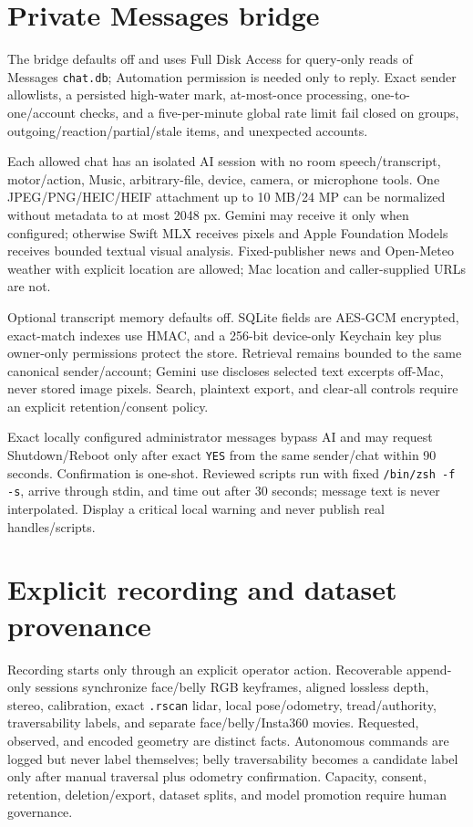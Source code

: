 \documentclass[10pt,openany]{book}
\begin{document}
\section{Private Messages bridge}

\Experimental\quad The bridge defaults off and uses Full Disk Access for query-only reads of Messages \texttt{chat.db}; Automation permission is needed only to reply. Exact sender allowlists, a persisted high-water mark, at-most-once processing, one-to-one/account checks, and a five-per-minute global rate limit fail closed on groups, outgoing/reaction/partial/stale items, and unexpected accounts.

Each allowed chat has an isolated AI session with no room speech/transcript, motor/action, Music, arbitrary-file, device, camera, or microphone tools. One JPEG/PNG/HEIC/HEIF attachment up to 10 MB/24 MP can be normalized without metadata to at most 2048 px. Gemini may receive it only when configured; otherwise Swift MLX receives pixels and Apple Foundation Models receives bounded textual visual analysis. Fixed-publisher news and Open-Meteo weather with explicit location are allowed; Mac location and caller-supplied URLs are not.

Optional transcript memory defaults off. SQLite fields are AES-GCM encrypted, exact-match indexes use HMAC, and a 256-bit device-only Keychain key plus owner-only permissions protect the store. Retrieval remains bounded to the same canonical sender/account; Gemini use discloses selected text excerpts off-Mac, never stored image pixels. Search, plaintext export, and clear-all controls require an explicit retention/consent policy.

Exact locally configured administrator messages bypass AI and may request Shutdown/Reboot only after exact \texttt{YES} from the same sender/chat within 90 seconds. Confirmation is one-shot. Reviewed scripts run with fixed \texttt{/bin/zsh -f -s}, arrive through stdin, and time out after 30 seconds; message text is never interpolated. Display a critical local warning and never publish real handles/scripts.

\section{Explicit recording and dataset provenance}

\Experimental\quad Recording starts only through an explicit operator action. Recoverable append-only sessions synchronize face/belly RGB keyframes, aligned lossless depth, stereo, calibration, exact \texttt{.rscan} lidar, local pose/odometry, tread/authority, traversability labels, and separate face/belly/Insta360 movies. Requested, observed, and encoded geometry are distinct facts. Autonomous commands are logged but never label themselves; belly traversability becomes a candidate label only after manual traversal plus odometry confirmation. Capacity, consent, retention, deletion/export, dataset splits, and model promotion require human governance.
\end{document}
